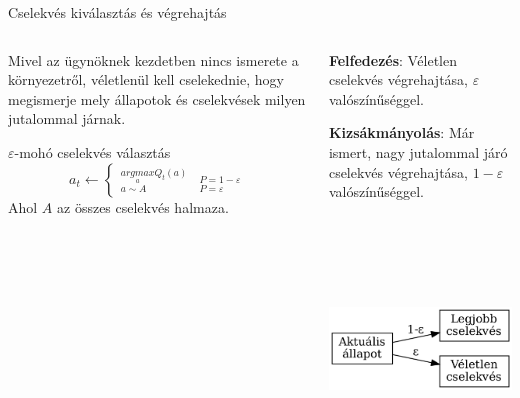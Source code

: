 \documentclass[english, aspectratio=169]{beamer}
\begin{document}
\begin{frame}{Cselekvés kiválasztás és végrehajtás}
\begin{columns}
\begin{column}{.5\textwidth}
Mivel az ügynöknek kezdetben nincs ismerete a környezetről, véletlenül kell cselekednie, hogy megismerje mely állapotok és cselekvések milyen jutalommal járnak.\par\smallskip
\begin{block}{$\varepsilon$-mohó cselekvés választás}
\[
a_{t}\leftarrow\begin{cases}
_{a\sim A}^{\underset{a}{argmax}Q_t(a)} & _{P=\varepsilon}^{P=1-\varepsilon}\end{cases}
\]
Ahol $A$ az összes cselekvés halmaza.
\end{block}
\end{column}
\begin{column}{.5\textwidth}
\textbf{Felfedezés}: Véletlen cselekvés végrehajtása, $\varepsilon$ valószínűséggel.\par\medskip
\textbf{Kizsákmányolás}: Már ismert, nagy jutalommal járó cselekvés végrehajtása, $1-\varepsilon$ valószínűséggel. 
\begin{center}
\includegraphics[width=7cm, height=7cm, keepaspectratio]{graphs/reinforcement_8.png}
\end{center}
\end{column}
\end{columns}
\end{frame}
\end{document}
